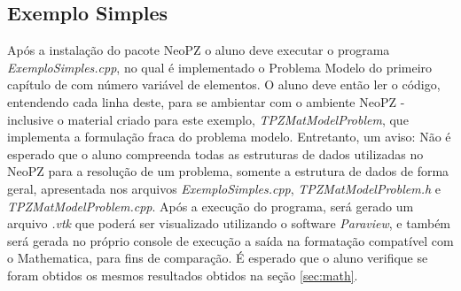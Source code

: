 \documentclass[11pt, oneside]{article}   	%
\begin{document}
\subsection{Exemplo Simples}
Após a instalação do pacote NeoPZ o aluno deve executar o programa \emph{ExemploSimples.cpp}, no qual é implementado o Problema Modelo do primeiro capítulo de \citet{oden81} com número variável de elementos. O aluno deve então ler o código, entendendo cada linha deste, para se ambientar com o ambiente NeoPZ - inclusive o material criado para este exemplo, \emph{TPZMatModelProblem}, que implementa a formulação fraca do problema modelo. Entretanto, um aviso: Não é esperado que o aluno compreenda todas as estruturas de dados utilizadas no NeoPZ para a resolução de um problema, somente a estrutura de dados de forma geral, apresentada nos arquivos \emph{ExemploSimples.cpp}, \emph{TPZMatModelProblem.h} e  \emph{TPZMatModelProblem.cpp}. Após a execução do programa, será gerado um arquivo \emph{.vtk} que poderá ser visualizado utilizando o software \emph{Paraview}, e também será gerada no próprio console de execução a saída na formatação compatível com o Mathematica, para fins de comparação. É esperado que o aluno verifique se foram obtidos os mesmos resultados obtidos na seção \ref{sec:math}.
\newpage


\end{document}
